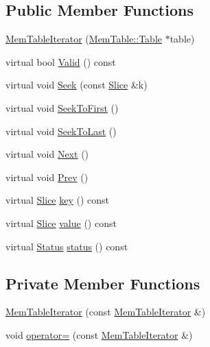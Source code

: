 \subsection*{Public Member Functions}
\begin{DoxyCompactItemize}
\item 
\hyperlink{classleveldb_1_1_mem_table_iterator_a3cf243a6e8166d55ce87081f69a5ecd7}{Mem\+Table\+Iterator} (\hyperlink{classleveldb_1_1_mem_table_af42bc32bc4c20aea12fc647ee41df058}{Mem\+Table\+::\+Table} $\ast$table)
\item 
virtual bool \hyperlink{classleveldb_1_1_mem_table_iterator_a95a8909aa37acb52f85a88c97329fa11}{Valid} () const 
\item 
virtual void \hyperlink{classleveldb_1_1_mem_table_iterator_a140f9575286994337de9b49ea7fe62cb}{Seek} (const \hyperlink{classleveldb_1_1_slice}{Slice} \&k)
\item 
virtual void \hyperlink{classleveldb_1_1_mem_table_iterator_a72eaf5c1bcb6d513f71d4edcb8db3f98}{Seek\+To\+First} ()
\item 
virtual void \hyperlink{classleveldb_1_1_mem_table_iterator_aaed044dc887a51c924086f2a2844a5f0}{Seek\+To\+Last} ()
\item 
virtual void \hyperlink{classleveldb_1_1_mem_table_iterator_a8ce5457cf61b989ce1ceec80084f891c}{Next} ()
\item 
virtual void \hyperlink{classleveldb_1_1_mem_table_iterator_a61f8a385b268158a1e7bd0cba29a83c1}{Prev} ()
\item 
virtual \hyperlink{classleveldb_1_1_slice}{Slice} \hyperlink{classleveldb_1_1_mem_table_iterator_a3e9b1c478d4ba8747dae4c8acb77a289}{key} () const 
\item 
virtual \hyperlink{classleveldb_1_1_slice}{Slice} \hyperlink{classleveldb_1_1_mem_table_iterator_a5910c8d44980cdec2d8ba603aabb98b8}{value} () const 
\item 
virtual \hyperlink{classleveldb_1_1_status}{Status} \hyperlink{classleveldb_1_1_mem_table_iterator_a1669aab641ff394968c30581a6b63f2a}{status} () const 
\end{DoxyCompactItemize}
\subsection*{Private Member Functions}
\begin{DoxyCompactItemize}
\item 
\hyperlink{classleveldb_1_1_mem_table_iterator_a7b539ae73a0d99580fdf1eb30f8c0181}{Mem\+Table\+Iterator} (const \hyperlink{classleveldb_1_1_mem_table_iterator}{Mem\+Table\+Iterator} \&)
\item 
void \hyperlink{classleveldb_1_1_mem_table_iterator_a4914bfee3ed31bca598ffcc201d994f4}{operator=} (const \hyperlink{classleveldb_1_1_mem_table_iterator}{Mem\+Table\+Iterator} \&)
\end{DoxyCompactItemize}
